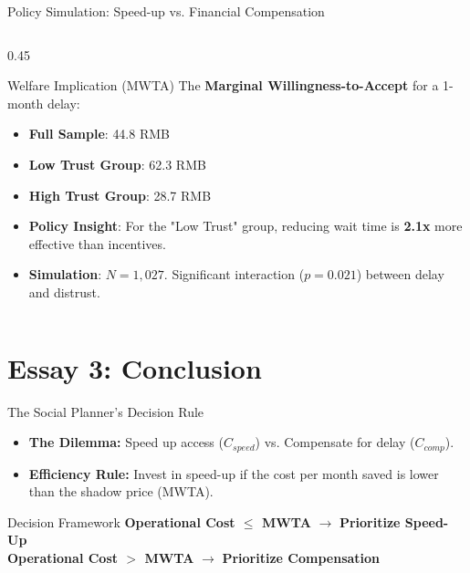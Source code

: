 \documentclass[10pt, aspectratio=169, xcolor={svgnames}]{beamer}
\begin{document}
\begin{frame}{Policy Simulation: Speed-up vs. Financial Compensation}
\begin{columns}[c]
        \begin{column}{0.45\textwidth}
            \begin{block}{Welfare Implication (MWTA)}
                \small
                The \textbf{Marginal Willingness-to-Accept} for a 1-month delay:
                \begin{itemize}
                    \item \textbf{Full Sample}: \alert{44.8 RMB}
                    \item \textbf{Low Trust Group}: \alert{62.3 RMB}
                    \item \textbf{High Trust Group}: \alert{28.7 RMB}
                \end{itemize}
            \end{block}

            \vspace{0.3cm}
            \begin{itemize}
                \item \textbf{Policy Insight}: For the "Low Trust" group, reducing wait time is \textbf{2.1x} more effective than incentives.
                \item \textbf{Simulation}: $N=1,027$. Significant interaction ($p=0.021$) between delay and distrust.
            \end{itemize}
        \end{column}
    \end{columns}
\end{frame}

\section{Essay 3: Conclusion}

\begin{frame}{The Social Planner's Decision Rule}
    \begin{itemize}
        \item \textbf{The Dilemma:} Speed up access ($C_{speed}$) vs. Compensate for delay ($C_{comp}$).
        \item \textbf{Efficiency Rule:} Invest in speed-up if the cost per month saved is lower than the shadow price (MWTA).
    \end{itemize}
    \begin{block}{Decision Framework}
        \centering
        \textbf{Operational Cost $\le$ MWTA} $\rightarrow$ \textbf{Prioritize Speed-Up} \\
        \textbf{Operational Cost $>$ MWTA} $\rightarrow$ \textbf{Prioritize Compensation}
    \end{block}
\end{frame}
\end{document}
